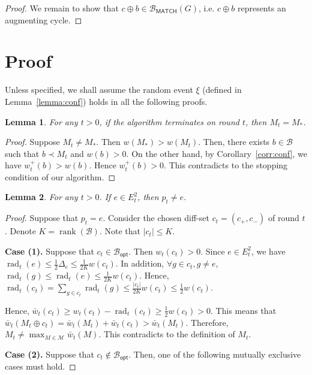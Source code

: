 \documentclass{article}
\newtheorem{lemma}{Lemma}
\newcommand{\M}{\mathcal M}
\newcommand{\diffvalid}{\prec}
\newcommand{\B}{\mathcal B}
\newcommand{\Bopt}{\mathcal B_{\mathsf{opt}}}
\newcommand{\Bmatch}{\mathcal B_{\mathsf{MATCH}}}
\DeclareMathOperator{\rank}{rank}
\DeclareMathOperator{\rad}{rad}
\begin{document}
\begin{spacing}{1.1}
\begin{proof}
We remain to show that $c\oplus b \in \Bmatch(G)$, i.e. $c\oplus b$ represents an augmenting cycle. 




\end{proof}



\section{Proof}

Unless specified, we shall assume the random event $\xi$ (defined in Lemma~\ref{lemma:conf}) holds in all the following proofs.


\begin{lemma}
\label{lemma:correct}
For any $t>0$, if the algorithm terminates on round $t$, then $M_t=M_*$.
\end{lemma}

\begin{proof}
Suppose $M_t \not= M_*$. Then $w(M_*)>w(M_t)$. 
Then, there exists $b \in \B$ such that $b \diffvalid M_t$ and $w(b)>0$.
On the other hand, by Corollary~\ref{corr:conf}, we have $w_t^+(b) > w(b)$.
Hence $w_t^+(b)>0$. This contradicts to the stopping condition of our algorithm.
\end{proof}

\begin{lemma}
For any $t>0$.
If $e\in E_t^2$, then $p_t\not= e$.
\end{lemma}

\begin{proof}
Suppose that $p_t=e$. Consider the chosen diff-set $c_t=(c_+,c_-)$ of round $t$.
Denote $K=\rank(\B)$. Note that $|c_t| \le K$.

\textbf{Case (1).} 
Suppose that $c_t\in\Bopt$. Then $w_t(c_t)>0$.
Since $e\in E_t^2$, we have $\rad_t(e) \le \frac{1}{2}\Delta_e \le \frac{1}{2K}w(c_t)$.
In addition, $\forall g\in c_t, g\not=e$, $\rad_t(g) \le \rad_t(e)\le \frac{1}{2K}w(c_t)$.
Hence, $\rad_t(c_t) = \sum_{g\in c_t} \rad_t(g) \le \frac{|c_t|}{2K}w(c_t) \le \frac{1}{2}w(c_t)$.

Hence, $\bar w_t(c_t) \ge w_t(c_t)-\rad_t(c_t) \ge \frac{1}{2}w(c_t) > 0$.
This means that $\bar w_t(M_t \oplus c_t) = \bar w_t(M_t)+\bar w_t(c_t) > \bar w_t(M_t)$.
Therefore, $M_t \not= \max_{M\in \M} \bar w_t(M)$.
This contradicts to the definition of $M_t$.

\textbf{Case (2).} 
Suppose that $c_t\not\in \Bopt$. Then, one of the following mutually exclusive cases must hold.


\end{proof}
\end{spacing}
\end{document}
